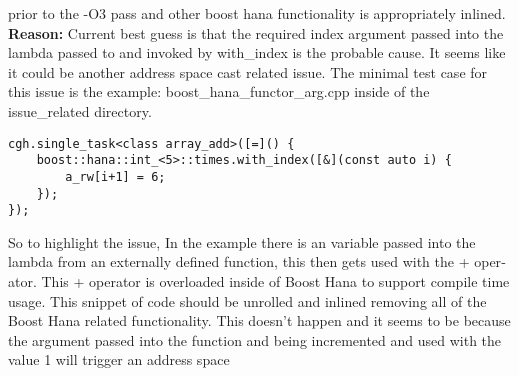 \begin{otherlanguage}{english}
                                         prior to the -O3 pass and other boost
                                         hana functionality is appropriately
                                         inlined.\\
                                         \textbf{Reason:} Current best guess is
                                         that the required index argument passed
                                         into the lambda passed to and invoked
                                         by with\_index is the probable cause.
                                         It seems like it could be another
                                         address space cast related issue. The
                                         minimal test case for this issue is
                                         the example:
                                         boost\_hana\_functor\_arg.cpp inside of
                                         the issue\_related directory.
                                         \begin{code}
                                             \begin{verbatim}
cgh.single_task<class array_add>([=]() {
    boost::hana::int_<5>::times.with_index([&](const auto i) {
        a_rw[i+1] = 6;
    });
});
                                             \end{verbatim}
                                         \end{code}
                                         So to highlight the issue, In the
                                         example there is an variable passed
                                         into the lambda from an externally
                                         defined function, this then gets used
                                         with the + operator. This + operator is
                                         overloaded inside of Boost Hana to
                                         support compile time usage. This
                                         snippet of code should be unrolled and
                                         inlined removing all of the Boost Hana
                                         related functionality. This doesn't
                                         happen and it seems to be because the
                                         argument passed into the function and
                                         being incremented and used with the
                                         value 1 will trigger an address space

\end{otherlanguage}
